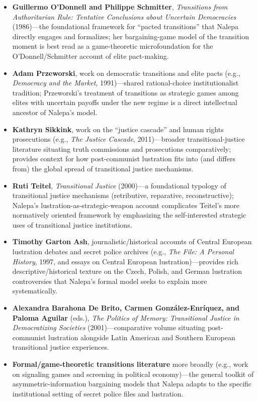 \documentclass[12pt]{article}
\begin{document}
\begin{itemize}[leftmargin=*, itemsep=4pt]
    \item \textbf{Guillermo O'Donnell and Philippe Schmitter}, \textit{Transitions from Authoritarian Rule: Tentative Conclusions about Uncertain Democracies} (1986)---the foundational framework for ``pacted transitions'' that Nalepa directly engages and formalizes; her bargaining-game model of the transition moment is best read as a game-theoretic microfoundation for the O'Donnell/Schmitter account of elite pact-making.
    \item \textbf{Adam Przeworski}, work on democratic transitions and elite pacts (e.g., \textit{Democracy and the Market}, 1991)---shared rational-choice institutionalist tradition; Przeworski's treatment of transitions as strategic games among elites with uncertain payoffs under the new regime is a direct intellectual ancestor of Nalepa's model.
    \item \textbf{Kathryn Sikkink}, work on the ``justice cascade'' and human rights prosecutions (e.g., \textit{The Justice Cascade}, 2011)---broader transitional-justice literature situating truth commissions and prosecutions comparatively; provides context for how post-communist lustration fits into (and differs from) the global spread of transitional justice mechanisms.
    \item \textbf{Ruti Teitel}, \textit{Transitional Justice} (2000)---a foundational typology of transitional justice mechanisms (retributive, reparative, reconstructive); Nalepa's lustration-as-strategic-weapon account complicates Teitel's more normatively oriented framework by emphasizing the self-interested strategic uses of transitional justice institutions.
    \item \textbf{Timothy Garton Ash}, journalistic/historical accounts of Central European lustration debates and secret police archives (e.g., \textit{The File: A Personal History}, 1997, and essays on Central European lustration)---provides rich descriptive/historical texture on the Czech, Polish, and German lustration controversies that Nalepa's formal model seeks to explain more systematically.
    \item \textbf{Alexandra Barahona De Brito, Carmen Gonz\'alez-Enr\'iquez, and Paloma Aguilar} (eds.), \textit{The Politics of Memory: Transitional Justice in Democratizing Societies} (2001)---comparative volume situating post-communist lustration alongside Latin American and Southern European transitional justice experiences.
    \item \textbf{Formal/game-theoretic transitions literature} more broadly (e.g., work on signaling games and screening in political economy)---the general toolkit of asymmetric-information bargaining models that Nalepa adapts to the specific institutional setting of secret police files and lustration.
\end{itemize}
\end{document}
